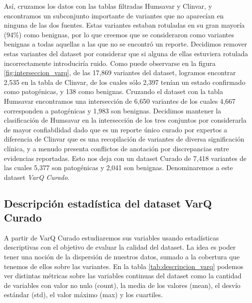 Así, cruzamos los datos con las tablas filtradas Humsavar y Clinvar, y encontramos un subconjunto importante de variantes que no aparecían en ninguna de las dos fuentes. Estas variantes estaban rotuladas en su gran mayoría (94\%) como benignas, por lo que creemos que se consideraron como variantes benignas a todas aquellas a las que no se encontró un reporte. Decidimos remover estas variantes del dataset por considerar que si alguna de ellas estuviera rotulada incorrectamente introduciría ruido. Como puede observarse en la figura \ref{fig:interseccion_varq}, de las 17,869 variantes del dataset, logramos encontrar 2,535 en la tabla de Clinvar, de los cuales sólo 2,397 tenían un estado confirmado como patogénicas, y 138 como benignas. Cruzando el dataset con la tabla Humsavar encontramos una intersección de 6,650 variantes de los cuales 4,667 corresponden a patogénicas y 1,983 son benignas. Decidimos mantener la clasificación de Humsavar en la intersección de los tres conjuntos por considerarla de mayor confiabilidad dado que es un reporte único curado por expertos a diferencia de Clinvar que es una recopilación de variantes de diversa significación clínica, y a menudo presenta conflictos de anotación por discrepancias entre evidencias reportadas. Esto nos deja con un dataset Curado de 7,418 variantes de las cuales 5,377 son patogénicas y 2,041 son benignas. Denominaremos a este dataset \textit{VarQ Curado}. 


\subsection{Descripción estadística del dataset VarQ Curado}

A partir de VarQ Curado estudiaremos sus variables usando estadísticas descriptivas con el objetivo de evaluar la calidad del dataset. La idea es poder tener una noción de la dispersión de nuestros datos, sumado a la cobertura que tenemos de ellos sobre las variantes. En la tabla \ref{tab:descripcion_varq} podemos ver distintas métricas sobre las variables continuas del dataset como la cantidad de variables con valor no nulo (count), la media de los valores (mean), el desvío estándar (std), el valor máximo (max) y los cuartiles. 

